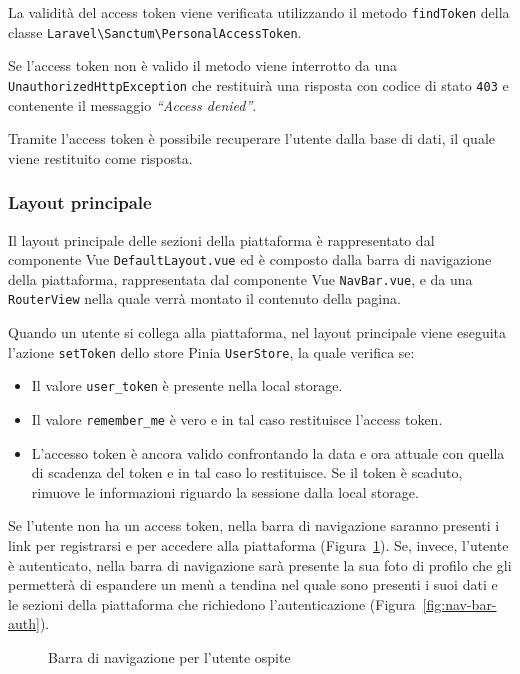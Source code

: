 La validit\`a del access token viene verificata utilizzando il metodo \verb|findToken| della classe \verb|Laravel\Sanctum\PersonalAccessToken|.

Se l'access token non \`e valido il metodo viene interrotto da una \verb|UnauthorizedHttpException| che restituir\`a una risposta con codice di stato \verb|403| e contenente il messaggio \textit{``Access denied''}.

Tramite l'access token \`e possibile recuperare l'utente dalla base di dati, il quale viene restituito come risposta.

\subsubsection{Layout principale}
Il layout principale delle sezioni della piattaforma \`e rappresentato dal componente Vue \verb|DefaultLayout.vue| ed \`e composto dalla barra di navigazione  della piattaforma, rappresentata dal componente Vue \verb|NavBar.vue|, e da una \verb|RouterView| nella quale verr\`a montato il contenuto della pagina.

Quando un utente si collega alla piattaforma, nel layout principale  viene eseguita l'azione \verb|setToken| dello store Pinia \verb|UserStore|, la quale verifica se:
\begin{itemize}
	\item Il valore \verb|user_token| \`e presente nella local storage.
	\item Il valore \verb|remember_me| \`e vero e in tal caso restituisce l'access token.
	\item L'accesso token \`e ancora valido confrontando la data e ora attuale con quella di scadenza del token e in tal caso lo restituisce. Se il token \`e scaduto, rimuove le informazioni riguardo la sessione dalla local storage.
\end{itemize}

Se l'utente non ha un access token, nella barra di navigazione saranno presenti i link per registrarsi e per accedere alla piattaforma (Figura~\ref{fig:nav-bar-guest}). Se, invece, l'utente \`e autenticato, nella barra di navigazione sar\`a presente la sua foto di profilo che gli permetter\`a di espandere un men\`u a tendina nel quale sono presenti i suoi dati e le sezioni della piattaforma che richiedono l'autenticazione (Figura~\ref{fig:nav-bar-auth}).

\begin{figure}[htbp]
	\centering
	\fboxsep=0.5pt
	\fboxrule=0.5pt
	\caption{Barra di navigazione per l'utente ospite}
	\label{fig:nav-bar-guest}
\end{figure}

